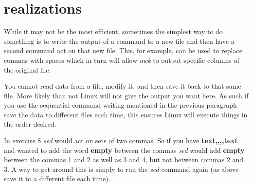 \documentclass{article}
\begin{document}
\section{realizations}
While it may not be the most efficient, sometimes the simplest way to do something is to write the output of a command to a new file and then have a second command act on that new file. This, for example, can be used to replace commas with spaces which in turn will allow \textit{awk} to output specific columns of the original file.

You cannot read data from a file, modify it, and then save it back to that same file. More likely than not Linux will not give the output you want here. As such if you use the sequential command writing mentioned in the previous paragraph save the data to different files each time, this ensures Linux will execute things in the order desired.

In exercise 8 \textit{sed} would act on sets of two commas. So if you have \textbf{text,,,,text} and wanted to add the word \textbf{empty} between the commas \textit{sed} would add \textbf{empty} between the commas 1 and 2 as well as 3 and 4, but not between commas 2 and 3. A way to get around this is simply to run the \textit{sed} command again (as above save it to a different file each time).
\end{document}
